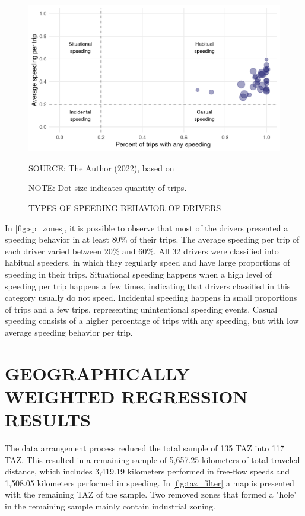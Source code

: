 \begin{figure}[!htbp]
    \centering\footnotesize
    \captionsetup{font=footnotesize}
    \caption{TYPES OF SPEEDING BEHAVIOR OF DRIVERS}
    \includegraphics{fig/richards_sp.png}
    \label{fig:sp_zones}
    \par SOURCE: The Author (2022), based on \textcite{Richard2013a}
    \par NOTE: Dot size indicates quantity of trips.
\end{figure}

In \autoref{fig:sp_zones}, it is possible to observe that most of the drivers presented a speeding behavior in at least 80\% of their trips. The average speeding per trip of each driver varied between 20\% and 60\%. All 32 drivers were classified into habitual speeders, in which they regularly speed and have large proportions of speeding in their trips. Situational speeding happens when a high level of speeding per trip happens a few times, indicating that drivers classified in this category usually do not speed. Incidental speeding happens in small proportions of trips and a few trips, representing unintentional speeding events. Casual speeding consists of a higher percentage of trips with any speeding, but with low average speeding behavior per trip.   

\section{GEOGRAPHICALLY WEIGHTED REGRESSION RESULTS} \label{sec:gwrr}



The data arrangement process reduced the total sample of 135 TAZ into 117 TAZ. This resulted in a remaining sample of 5,657.25 kilometers of total traveled distance, which includes 3,419.19 kilometers performed in free-flow speeds and 1,508.05 kilometers performed in speeding. In \autoref{fig:taz_filter} a map is presented with the remaining TAZ of the sample. Two removed zones that formed a "hole" in the remaining sample mainly contain industrial zoning. 

